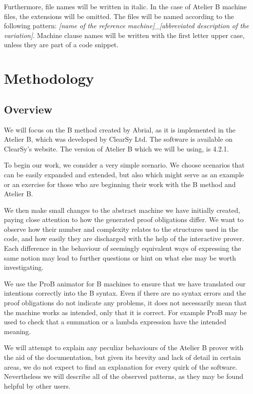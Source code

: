 \documentclass[12pt,journal,duplex]{IEEEtran}
\begin{document}
	Furthermore, file names will be written in italic. In the case of Atelier B machine files, the extensions will be omitted. The files will be named according to the following pattern: \emph{[name of the reference machine]\_[abbreviated description of the variation]}. Machine clause names will be written with the first letter upper case, unless they are part of a code snippet.

	\section{Methodology}
	\subsection{Overview}
	We will focus on the B method created by Abrial, as it is implemented in the Atelier B, which was developed by ClearSy Ltd. The software is available on ClearSy's website. The version of Atelier B which we will be using, is 4.2.1.

	To begin our work, we consider a very simple scenario. We choose scenarios that can be easily expanded and extended, but also which might serve as an example or an exercise for those who are beginning their work with the B method and Atelier B.

	We then make small changes to the abstract machine we have initially created, paying close attention to how the generated proof obligations differ. We want to observe how their number and complexity relates to the structures used in the code, and how easily they are discharged with the help of the interactive prover. Each difference in the behaviour of seemingly equivalent ways of expressing the same notion may lead to further questions or hint on what else may be worth investigating.

	We use the ProB animator for B machines to ensure that we have translated our intentions correctly into the B syntax. Even if there are no syntax errors and the proof obligations do not indicate any problems, it does not necessarily mean that the machine works as intended, only that it is correct. For example ProB may be used to check that a summation or a lambda expression have the intended meaning.

	We will attempt to explain any peculiar behaviours of the Atelier B prover with the aid of the documentation, but given its brevity and lack of detail in certain areas, we do not expect to find an explanation for every quirk of the software. Nevertheless we will describe all of the observed patterns, as they may be found helpful by other users.
\end{document}
